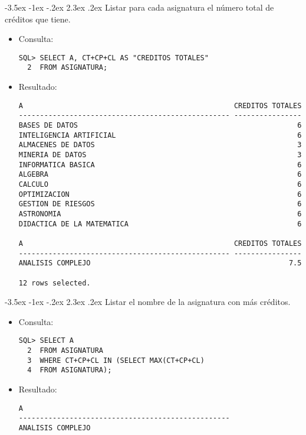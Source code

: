 \documentclass[11pt]{report}
\makeatletter
\renewcommand\chapter{\@startsection{chapter}{0}{\z@}%
    {-3.5ex \@plus -1ex \@minus -.2ex}%
    {2.3ex \@plus.2ex}%
    {\normalfont\Large\bfseries}}
\makeatother
\begin{document}
\chapter{Listar para cada asignatura el número total de créditos que tiene.}
\begin{itemize}
  \item Consulta:
  \begin{verbatim}
SQL> SELECT A, CT+CP+CL AS "CREDITOS TOTALES"
  2  FROM ASIGNATURA;
  \end{verbatim}
  \item{Resultado:}
  \begin{verbatim}
A                                                  CREDITOS TOTALES             
-------------------------------------------------- ----------------             
BASES DE DATOS                                                    6             
INTELIGENCIA ARTIFICIAL                                           6             
ALMACENES DE DATOS                                                3             
MINERIA DE DATOS                                                  3             
INFORMATICA BASICA                                                6             
ALGEBRA                                                           6             
CALCULO                                                           6             
OPTIMIZACION                                                      6             
GESTION DE RIESGOS                                                6             
ASTRONOMIA                                                        6             
DIDACTICA DE LA MATEMATICA                                        6             

A                                                  CREDITOS TOTALES             
-------------------------------------------------- ----------------             
ANALISIS COMPLEJO                                               7.5             

12 rows selected.                                                                            
  \end{verbatim}
\end{itemize}

\chapter{Listar el nombre de la asignatura con más créditos.}
\begin{itemize}
  \item Consulta:
  \begin{verbatim}
SQL> SELECT A
  2  FROM ASIGNATURA
  3  WHERE CT+CP+CL IN (SELECT MAX(CT+CP+CL)
  4  FROM ASIGNATURA);
  \end{verbatim}
  \item{Resultado:}
  \begin{verbatim}
A                                                                               
--------------------------------------------------                              
ANALISIS COMPLEJO                                                                        
  \end{verbatim}
\end{itemize}
\end{document}
